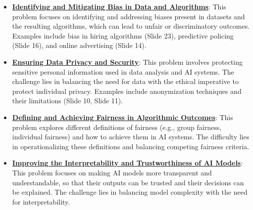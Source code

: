 \documentclass{article}%
\begin{document}
\begin{itemize}[leftmargin=*]%
\item \href{https://purdue.brightspace.com/d2l/common/assets/pdfjs-d2l-dist/1.0.14-legacy/web/viewer.html?file=\%2Fcontent\%2Fenforced\%2F1095467-wl.202510.CS.24300.001\%2F16L2-ethics.pdf\%3Fou\%3D1095467\&lang=en-us\&container=d2l-fileviewer-rendered-pdf\&fullscreen=d2l-fileviewer-rendered-pdf-dialog\&height=667#page=2}{\textbf{Identifying and Mitigating Bias in Data and Algorithms}}: This problem focuses on identifying and addressing biases present in datasets and the resulting algorithms, which can lead to unfair or discriminatory outcomes. Examples include bias in hiring algorithms (Slide 23), predictive policing (Slide 16), and online advertising (Slide 14).%
\item \href{https://purdue.brightspace.com/d2l/common/assets/pdfjs-d2l-dist/1.0.14-legacy/web/viewer.html?file=\%2Fcontent\%2Fenforced\%2F1095467-wl.202510.CS.24300.001\%2F16L2-ethics.pdf\%3Fou\%3D1095467\&lang=en-us\&container=d2l-fileviewer-rendered-pdf\&fullscreen=d2l-fileviewer-rendered-pdf-dialog\&height=667#page=10}{\textbf{Ensuring Data Privacy and Security}}: This problem involves protecting sensitive personal information used in data analysis and AI systems. The challenge lies in balancing the need for data with the ethical imperative to protect individual privacy. Examples include anonymization techniques and their limitations (Slide 10, Slide 11).%
\item \href{https://purdue.brightspace.com/d2l/common/assets/pdfjs-d2l-dist/1.0.14-legacy/web/viewer.html?file=\%2Fcontent\%2Fenforced\%2F1095467-wl.202510.CS.24300.001\%2F16L2-ethics.pdf\%3Fou\%3D1095467\&lang=en-us\&container=d2l-fileviewer-rendered-pdf\&fullscreen=d2l-fileviewer-rendered-pdf-dialog\&height=667#page=18}{\textbf{Defining and Achieving Fairness in Algorithmic Outcomes}}: This problem explores different definitions of fairness (e.g., group fairness, individual fairness) and how to achieve them in AI systems. The difficulty lies in operationalizing these definitions and balancing competing fairness criteria.%
\item \href{https://purdue.brightspace.com/d2l/common/assets/pdfjs-d2l-dist/1.0.14-legacy/web/viewer.html?file=\%2Fcontent\%2Fenforced\%2F1095467-wl.202510.CS.24300.001\%2F16L2-ethics.pdf\%3Fou\%3D1095467\&lang=en-us\&container=d2l-fileviewer-rendered-pdf\&fullscreen=d2l-fileviewer-rendered-pdf-dialog\&height=667#page=28}{\textbf{Improving the Interpretability and Trustworthiness of AI Models}}: This problem focuses on making AI models more transparent and understandable, so that their outputs can be trusted and their decisions can be explained. The challenge lies in balancing model complexity with the need for interpretability.%
\end{itemize}
\end{document}
